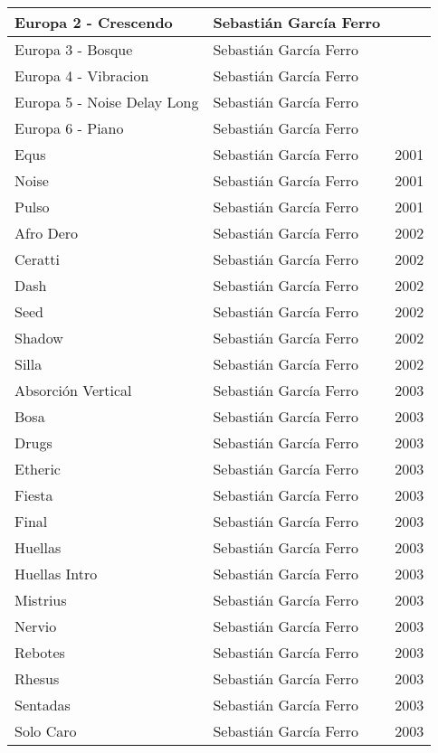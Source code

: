 \begin{center}
\begin{longtable}{ p{}  p{}  p{} }
Europa 2 - Crescendo & Sebastián García Ferro &  \\ \midrule 
Europa 3 - Bosque & Sebastián García Ferro &  \\ \midrule 
Europa 4 - Vibracion & Sebastián García Ferro &  \\ \midrule 
Europa 5 - Noise Delay Long & Sebastián García Ferro &  \\ \midrule 
Europa 6 - Piano & Sebastián García Ferro &  \\ \midrule 
Equs & Sebastián García Ferro & 2001 \\ \midrule 
Noise & Sebastián García Ferro & 2001 \\ \midrule 
Pulso & Sebastián García Ferro & 2001 \\ \midrule 
Afro Dero & Sebastián García Ferro & 2002 \\ \midrule 
Ceratti & Sebastián García Ferro & 2002 \\ \midrule 
Dash & Sebastián García Ferro & 2002 \\ \midrule 
Seed & Sebastián García Ferro & 2002 \\ \midrule 
Shadow & Sebastián García Ferro & 2002 \\ \midrule 
Silla & Sebastián García Ferro & 2002 \\ \midrule 
Absorción Vertical & Sebastián García Ferro & 2003 \\ \midrule 
Bosa & Sebastián García Ferro & 2003 \\ \midrule 
Drugs & Sebastián García Ferro & 2003 \\ \midrule 
Etheric & Sebastián García Ferro & 2003 \\ \midrule 
Fiesta & Sebastián García Ferro & 2003 \\ \midrule 
Final & Sebastián García Ferro & 2003 \\ \midrule 
Huellas & Sebastián García Ferro & 2003 \\ \midrule 
Huellas Intro & Sebastián García Ferro & 2003 \\ \midrule 
Mistrius & Sebastián García Ferro & 2003 \\ \midrule 
Nervio & Sebastián García Ferro & 2003 \\ \midrule 
Rebotes & Sebastián García Ferro & 2003 \\ \midrule 
Rhesus & Sebastián García Ferro & 2003 \\ \midrule 
Sentadas & Sebastián García Ferro & 2003 \\ \midrule 
Solo Caro & Sebastián García Ferro & 2003 \\ \midrule 

\end{longtable}
\end{center}
